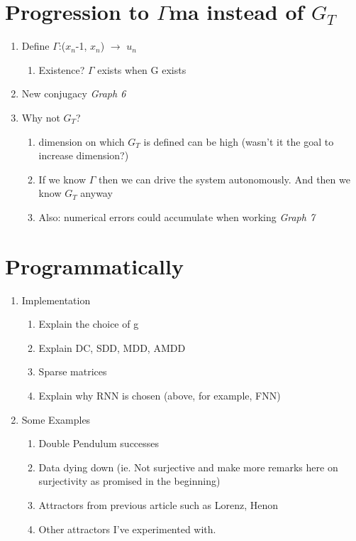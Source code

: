 \documentclass[12pt, oneside]{article}
\theoremstyle{definition}
\begin{document}
\section{Progression to $\Gamma$ma instead of $G_{T}$}

\begin{enumerate}
  \item Define $\Gamma$:($x_{n}$-1, $x_{n}$) $\rightarrow$ $u_{n}$
  \begin{enumerate}
      \item Existence? $\Gamma$ exists when G exists  
  \end{enumerate}
  \item New conjugacy  
  \newline \emph{Graph 6}
  \item Why not $G_{T}$?
  \begin{enumerate}
    \item dimension on which $G_{T}$ is defined can be high (wasn’t it the goal to increase dimension?)
    \item  If we know $\Gamma$ then we can drive the system autonomously. 
    \newline  And then we know $G_{T}$ anyway
    \item Also: numerical errors could accumulate  when working
    \newline \emph{Graph 7}
  \end{enumerate}
\end{enumerate}



\section{Programmatically} 
\begin{enumerate}
  \item Implementation
  \begin{enumerate}
    \item Explain the choice of g
    \item Explain DC, SDD, MDD, AMDD
    \item Sparse matrices
    \item Explain why RNN is chosen (above, for example, FNN)
  \end{enumerate}
  \item Some Examples
  \begin{enumerate}
    \item Double Pendulum successes
    \item Data dying down (ie. Not surjective and make more remarks here on surjectivity as promised in the beginning)
    \item Attractors from previous article such as Lorenz, Henon
    \item Other attractors I’ve experimented with.
  \end{enumerate}
\end{enumerate}
\end{document}
